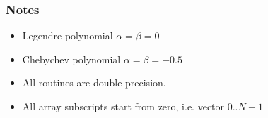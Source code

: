 \subsubsection{Notes}
\begin{itemize}
\item Legendre polynomial $\alpha = \beta = 0$
\item Chebychev polynomial $\alpha = \beta = -0.5$
\item All routines are double precision.
\item All array subscripts start from zero, i.e. vector $0..N-1$
\end{itemize}


